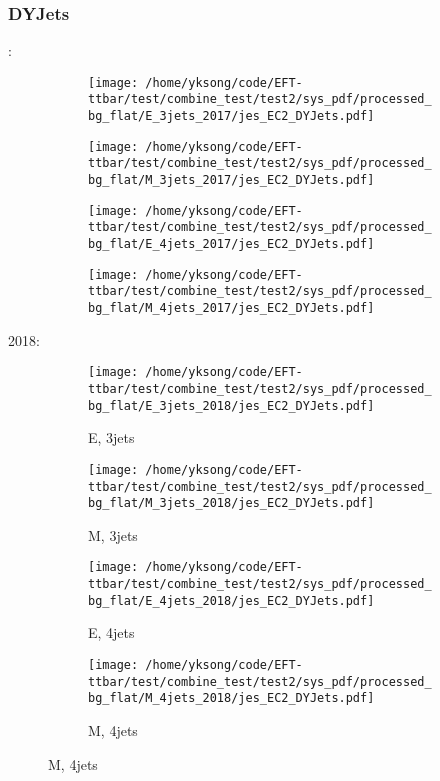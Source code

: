 \documentclass{beamer}
\begin{document}
\begin{frame}
\frametitle{DYJets}
\fontsize{5}{1}:
\begin{figure}
\centering
\begin{subfigure}[b]{0.24\textwidth}
\texttt{[image: /home/yksong/code/EFT-ttbar/test/combine\_test/test2/sys\_pdf/processed\_bg\_flat/E\_3jets\_2017/jes\_EC2\_DYJets.pdf]}
\end{subfigure}
\begin{subfigure}[b]{0.24\textwidth}
\texttt{[image: /home/yksong/code/EFT-ttbar/test/combine\_test/test2/sys\_pdf/processed\_bg\_flat/M\_3jets\_2017/jes\_EC2\_DYJets.pdf]}
\end{subfigure}
\begin{subfigure}[b]{0.24\textwidth}
\texttt{[image: /home/yksong/code/EFT-ttbar/test/combine\_test/test2/sys\_pdf/processed\_bg\_flat/E\_4jets\_2017/jes\_EC2\_DYJets.pdf]}
\end{subfigure}
\begin{subfigure}[b]{0.24\textwidth}
\texttt{[image: /home/yksong/code/EFT-ttbar/test/combine\_test/test2/sys\_pdf/processed\_bg\_flat/M\_4jets\_2017/jes\_EC2\_DYJets.pdf]}
\end{subfigure}
\end{figure}
2018:
\begin{figure}
\centering
\begin{subfigure}[b]{0.24\textwidth}
\texttt{[image: /home/yksong/code/EFT-ttbar/test/combine\_test/test2/sys\_pdf/processed\_bg\_flat/E\_3jets\_2018/jes\_EC2\_DYJets.pdf]}
\captionsetup{font=tiny}
\caption{E, 3jets}
\end{subfigure}
\begin{subfigure}[b]{0.24\textwidth}
\texttt{[image: /home/yksong/code/EFT-ttbar/test/combine\_test/test2/sys\_pdf/processed\_bg\_flat/M\_3jets\_2018/jes\_EC2\_DYJets.pdf]}
\captionsetup{font=tiny}
\caption{M, 3jets}
\end{subfigure}
\begin{subfigure}[b]{0.24\textwidth}
\texttt{[image: /home/yksong/code/EFT-ttbar/test/combine\_test/test2/sys\_pdf/processed\_bg\_flat/E\_4jets\_2018/jes\_EC2\_DYJets.pdf]}
\captionsetup{font=tiny}
\caption{E, 4jets}
\end{subfigure}
\begin{subfigure}[b]{0.24\textwidth}
\texttt{[image: /home/yksong/code/EFT-ttbar/test/combine\_test/test2/sys\_pdf/processed\_bg\_flat/M\_4jets\_2018/jes\_EC2\_DYJets.pdf]}
\captionsetup{font=tiny}
\caption{M, 4jets}
\end{subfigure}
\end{figure}
\end{frame}
\end{document}
